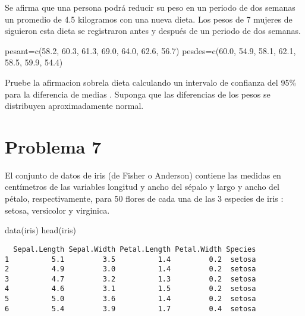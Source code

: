\documentclass[
]{article}
\newenvironment{Shaded}{\begin{snugshade}}{\end{snugshade}}
\newcommand{\FloatTok}[1]{\textcolor[rgb]{0.00,0.00,0.81}{#1}}
\newcommand{\FunctionTok}[1]{\textcolor[rgb]{0.00,0.00,0.00}{#1}}
\newcommand{\NormalTok}[1]{#1}
\newcommand{\OtherTok}[1]{\textcolor[rgb]{0.56,0.35,0.01}{#1}}
\begin{document}
Se afirma que una persona podrá reducir su peso en un periodo de dos
semanas un promedio de 4.5 kilogramos con una nueva dieta. Los pesos de
7 mujeres de siguieron esta dieta se registraron antes y después de un
periodo de dos semanas.

\begin{Shaded}
\begin{Highlighting}[]
\NormalTok{pesant}\OtherTok{=}\FunctionTok{c}\NormalTok{(}\FloatTok{58.2}\NormalTok{, }\FloatTok{60.3}\NormalTok{, }\FloatTok{61.3}\NormalTok{, }\FloatTok{69.0}\NormalTok{, }\FloatTok{64.0}\NormalTok{, }\FloatTok{62.6}\NormalTok{, }\FloatTok{56.7}\NormalTok{)}
\NormalTok{pesdes}\OtherTok{=}\FunctionTok{c}\NormalTok{(}\FloatTok{60.0}\NormalTok{, }\FloatTok{54.9}\NormalTok{, }\FloatTok{58.1}\NormalTok{, }\FloatTok{62.1}\NormalTok{, }\FloatTok{58.5}\NormalTok{, }\FloatTok{59.9}\NormalTok{, }\FloatTok{54.4}\NormalTok{)}
\end{Highlighting}
\end{Shaded}

Pruebe la afirmacion sobrela dieta calculando un intervalo de confianza
del 95\% para la diferencia de medias . Suponga que las diferencias de
los pesos se distribuyen aproximadamente normal.

\hypertarget{problema-7}{%
\section{\texorpdfstring{\textbf{Problema
7}}{Problema 7}}\label{problema-7}}

El conjunto de datos de iris (de Fisher o Anderson) contiene las medidas
en centímetros de las variables longitud y ancho del sépalo y largo y
ancho del pétalo, respectivamente, para 50 flores de cada una de las 3
especies de iris : setosa, versicolor y virginica.

\begin{Shaded}
\begin{Highlighting}[]
\FunctionTok{data}\NormalTok{(iris)}
\FunctionTok{head}\NormalTok{(iris)}
\end{Highlighting}
\end{Shaded}

\begin{verbatim}
  Sepal.Length Sepal.Width Petal.Length Petal.Width Species
1          5.1         3.5          1.4         0.2  setosa
2          4.9         3.0          1.4         0.2  setosa
3          4.7         3.2          1.3         0.2  setosa
4          4.6         3.1          1.5         0.2  setosa
5          5.0         3.6          1.4         0.2  setosa
6          5.4         3.9          1.7         0.4  setosa
\end{verbatim}
\end{document}
